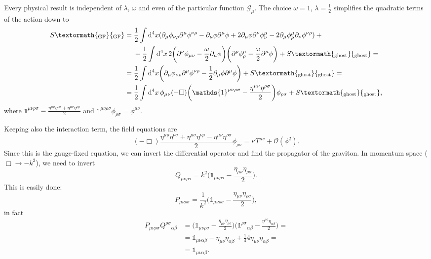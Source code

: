 \documentclass[a4paper,12pt]{book}
\newcommand{\ped}[1]{\textormath{\textsubscript{#1}}{_{\mathrm{#1}}}}
\newcommand{\dd}{\mathop{\mathrm{d}\!}{}}
\theoremstyle{definition}
\theoremstyle{remark}
\begin{document}
Every physical result is independent of $\lambda$, $\omega$ and even of the particular function $\mathcal G_\mu$. The choice $\omega=1$, $\lambda=\frac12$ simplifies the quadratic terms of the action down to
\begin{align*}
S\ped{GF}={}&\frac12\int\dd^4x(\partial_\mu\phi_{\nu\rho}\partial^\mu\phi^{\nu\rho}-\partial_\mu\phi\partial^\mu\phi+2\partial_\mu\phi\partial^\nu\phi^\mu_\nu-2\partial_\mu\phi^\mu_\rho\partial_\nu\phi^{\nu\rho})+{}\\
&+\frac12\int\dd^4x\,2\biggl(\partial^\nu\phi_{\mu\nu}-\frac\omega2\partial_\mu\phi\biggr)\biggl(\partial^\rho\phi_\rho^\mu-\frac\omega2\partial^\mu\phi\biggr)+S\ped{ghost}=\\
={}&\frac12\int\dd^4x\biggl(\partial_\mu\phi_{\nu\rho}\partial^\mu\phi^{\nu\rho}-\frac12\partial_\mu\phi\partial^\mu\phi\biggr)+S\ped{ghost}=\\
={}&\frac12\int\dd^4x\,\phi_{\mu\nu}(-\Box)\biggl(\mathds{1}^{\mu\nu\rho\sigma}-\frac{\eta^{\mu\nu}\eta^{\rho\sigma}}2\biggr)\phi_{\rho\sigma}+S\ped{ghost},
\end{align*}
where $\mathds{1}^{\mu\nu\rho\sigma}\equiv\frac{\eta^{\mu\rho}\eta^{\nu\sigma}+\eta^{\mu\sigma}\eta^{\nu\rho}}2$ and $\mathds{1}^{\mu\nu\rho\sigma}\phi_{\rho\sigma}=\phi^{\mu\nu}$.

Keeping also the interaction term, the field equations are
\[(-\Box)\frac{\eta^{\mu\rho}\eta^{\nu\sigma}+\eta^{\mu\sigma}\eta^{\nu\rho}-\eta^{\mu\nu}\eta^{\rho\sigma}}2\phi_{\rho\sigma}=\kappa T^{\mu\nu}+\mathcal O(\phi^2).\]
Since this is the gauge-fixed equation, we can invert the differential operator and find the propagator of the graviton. In momentum space ($\Box\to-k^2$), we need to invert
\[Q_{\mu\nu\rho\sigma}=k^2\biggl(\mathds{1}_{\mu\nu\rho\sigma}-\frac{\eta_{\mu\nu}\eta_{\rho\sigma}}2\biggr).\]
This is easily done:
\[P_{\mu\nu\rho\sigma}=\frac1{k^2}\biggl(\mathds{1}_{\mu\nu\rho\sigma}-\frac{\eta_{\mu\nu}\eta_{\rho\sigma}}2\biggr),\]
in fact
\begin{align*}
P_{\mu\nu\rho\sigma}Q^{\rho\sigma}{}_{\alpha\beta}&=\biggl(\mathds{1}_{\mu\nu\rho\sigma}-\frac{\eta_{\mu\nu}\eta_{\rho\sigma}}2\biggr)\biggl(\mathds{1}^{\rho\sigma}{}_{\alpha\beta}-\frac{\eta^{\rho\sigma}\eta_{\alpha\beta}}2\biggr)=\\
&=\mathds{1}_{\mu\nu\alpha\beta}-\eta_{\mu\nu}\eta_{\alpha\beta}+\frac144\eta_{\mu\nu}\eta_{\alpha\beta}=\\
&=\mathds{1}_{\mu\nu\alpha\beta}.
\end{align*}
\end{document}
